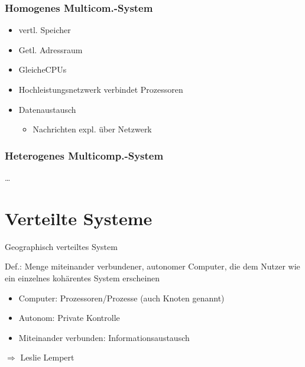 \subsubsection{Homogenes Multicom.-System}
\begin{itemize}
	\item vertl. Speicher
	\item Getl. Adressraum
	\item GleicheCPUs
	\item Hochleistungsnetzwerk verbindet Prozessoren
	\item Datenaustausch
		\begin{itemize}
			\item Nachrichten expl. über Netzwerk
		\end{itemize}

\end{itemize}

\subsubsection{Heterogenes Multicomp.-System}
\ldots


\section{Verteilte Systeme}
Geographisch verteiltes System

Def.: Menge miteinander verbundener, autonomer Computer, die dem Nutzer wie ein einzelnes kohärentes System erscheinen
\begin{itemize}
	\item Computer: Prozessoren/Prozesse (auch Knoten genannt)
	\item Autonom: Private Kontrolle
	\item Miteinander verbunden: Informationsaustausch
\end{itemize}

$\Rightarrow$ Leslie Lempert

